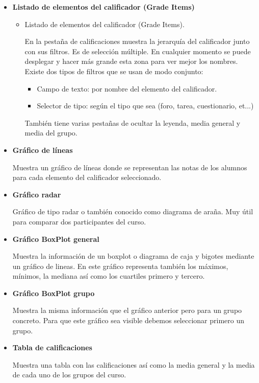 \begin{itemize}
	\item \textbf{Listado de elementos del calificador (Grade Items)}
		\begin{itemize}
			\item Listado de elementos del calificador (Grade Items). 
			
			En la pestaña de calificaciones muestra la jerarquía del calificador junto con sus filtros. Es de selección múltiple. En cualquier momento se puede desplegar y hacer más grande esta zona para ver mejor los nombres.
			Existe dos tipos de filtros que se usan de modo conjunto:
			\begin{itemize}
				\item Campo de texto: por nombre del elemento del calificador.
				\item Selector de tipo: según el tipo que sea  (foro, tarea, cuestionario, et...)
			\end{itemize}
			También tiene varias pestañas de ocultar la leyenda, media general y media del grupo.
		\end{itemize}
	\item \textbf{Gráfico de líneas}
	
		Muestra un gráfico de líneas donde se representan las notas de los alumnos para cada elemento del calificador seleccionado.
	\item \textbf{Gráfico radar}
	
		Gráfico de tipo radar o también conocido como diagrama de araña. Muy útil para comparar dos participantes del curso.
	\item \textbf{Gráfico BoxPlot general}
	
		Muestra la información de un boxplot o diagrama de caja y bigotes mediante un gráfico de lineas. En este gráfico representa también los máximos, mínimos, la mediana así como los cuartiles primero y tercero.
		
	\item \textbf{Gráfico BoxPlot grupo}
	
	Muestra la misma información que el gráfico anterior pero para un grupo concreto. Para que este gráfico sea visible debemos seleccionar primero un grupo.
	
	
	\item  \textbf{Tabla de calificaciones}
	
	Muestra una tabla con las calificaciones así como la media general y la media de cada uno de los grupos del curso.
\end{itemize}


